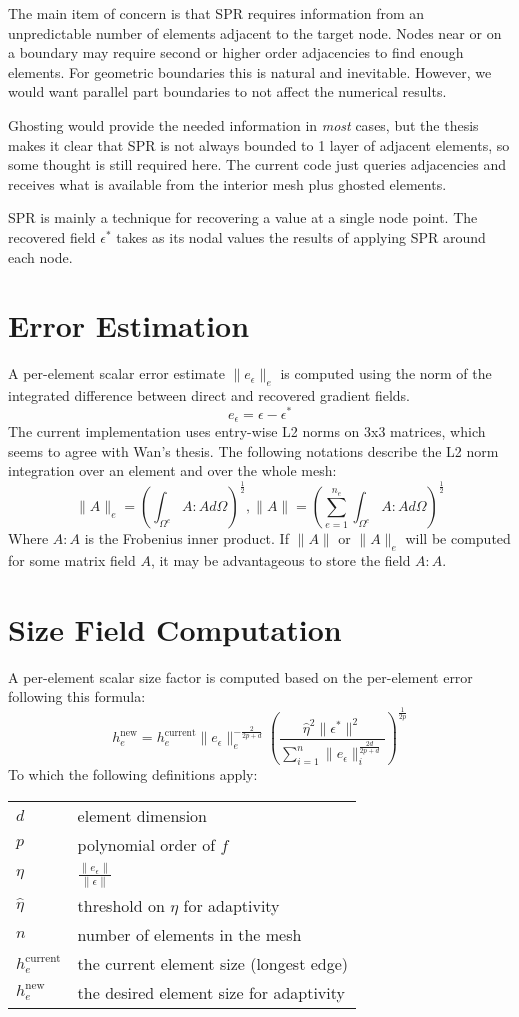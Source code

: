 \documentclass{article}
\begin{document}
The main item of concern is that SPR requires information from
an unpredictable number of elements adjacent to the target node.
Nodes near or on a boundary may require second or higher
order adjacencies to find enough elements.
For geometric boundaries this is natural and inevitable.
However, we would want parallel part boundaries to not affect the
numerical results.

Ghosting would provide the needed information in \emph{most} cases,
but the thesis makes it clear that SPR is not always bounded
to 1 layer of adjacent elements, so some thought is still required here.
The current code just queries adjacencies and receives what is available
from the interior mesh plus ghosted elements.

SPR is mainly a technique for recovering a value at a single node point.
The recovered field $\epsilon^*$ takes as its
nodal values the results of applying SPR around each node.

\section{Error Estimation}
A per-element scalar error estimate
$\|e_\epsilon\|_e$ is computed using the
norm of the integrated difference between
direct and recovered gradient fields.
\[e_\epsilon=\epsilon - \epsilon^*\]
The current implementation uses entry-wise L2 norms on
3x3 matrices, which seems to agree with Wan's thesis.
The following notations describe the L2 norm integration
over an element and over the whole mesh:
\[\|A\|_e=
\left(
\int_{\Omega^e} A : A d\Omega
\right)^\frac12,
\|A\|=
\left(
\sum_{e=1}^{n_e}
\int_{\Omega^e} A : A d\Omega
\right)^\frac12\]
Where $A:A$ is the Frobenius inner product.
If $\|A\|$ or $\|A\|_e$ will be computed for
some matrix field $A$, it may be advantageous
to store the field $A:A$.

\section{Size Field Computation}
A per-element scalar size factor is computed based on
the per-element error following this formula:
\[h^\text{new}_e = h^\text{current}_e
\|e_\epsilon\|^{-\frac{2}{2p+d}}_e
\left(
\frac
{\hat{\eta}^2\|\epsilon^*\|^2}
{\sum_{i=1}^n\|e_\epsilon\|^\frac{2d}{2p+d}_i}
\right)^\frac{1}{2p}
\]
To which the following definitions apply:

\begin{center}
\begin{tabular}{ll}
$d$ & element dimension \\
$p$ & polynomial order of $f$ \\
$\eta$ & $\frac{\|e_\epsilon\|}{\|\epsilon\|}$ \\
$\hat{\eta}$ & threshold on $\eta$ for adaptivity \\
$n$ & number of elements in the mesh \\
$h_e^\text{current}$ & the current element size (longest edge) \\
$h_e^\text{new}$ & the desired element size for adaptivity \\
\end{tabular}
\end{center}
\end{document}
